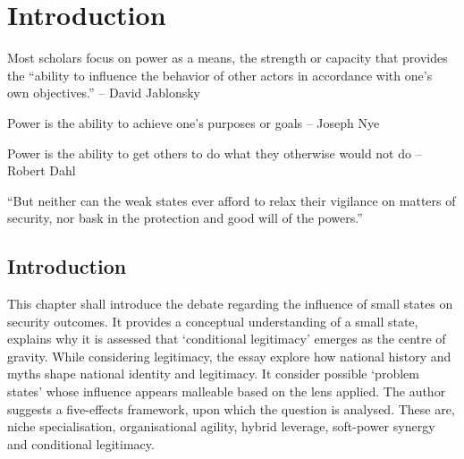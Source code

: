 
\chapter{Introduction}


Most scholars focus on power as a means, the strength or capacity that provides the “ability to influence the behavior of other actors in accordance with one’s own objectives.” – David Jablonsky

Power is the ability to achieve one’s purposes or goals – Joseph Nye

Power is the ability to get others to do what they otherwise would not do – Robert Dahl


\epigraph{“But neither can the weak states ever afford to relax their vigilance on matters of security, nor bask in the protection and good will of the powers.”}{\parencite{HANDEL_2005}}

\section*{Introduction}
This chapter shall introduce the debate regarding the influence of small states on security outcomes. It provides a conceptual understanding of a small state, explains why it is assessed that `conditional legitimacy' emerges as the centre of gravity. While considering legitimacy, the essay explore how national history and myths shape national identity and legitimacy. It consider possible `problem states' whose influence appears malleable based on the lens applied. The author suggests a five-effects framework, upon which the question is analysed. These are, niche specialisation, organisational agility, hybrid leverage, soft-power synergy and conditional legitimacy. 


